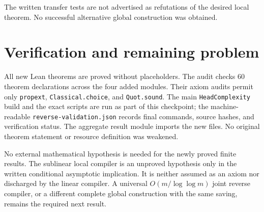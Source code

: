 \documentclass[11pt]{article}
\begin{document}
The written transfer tests are not advertised as refutations of the
desired local theorem. No successful alternative global construction was
obtained.

\section{Verification and remaining problem}
All new Lean theorems are proved without placeholders. The audit checks
60 theorem declarations across the four added modules. Their axiom audits
permit only \texttt{propext}, \texttt{Classical.choice}, and
\texttt{Quot.sound}. The main \texttt{HeadComplexity} build and the exact
scripts are run as part of this checkpoint; the machine-readable
\texttt{reverse-validation.json} records final commands, source hashes,
and verification status. The aggregate result module imports the new
files. No original theorem statement or resource definition was weakened.

No external mathematical hypothesis is needed for the newly proved finite
results. The sublinear local compiler is an unproved hypothesis only in
the written conditional asymptotic implication. It is neither assumed as
an axiom nor discharged by the linear compiler. A universal
$O(m/\log\log m)$ joint reverse compiler, or a different complete
global construction with the same saving, remains the required next result.
\end{document}
